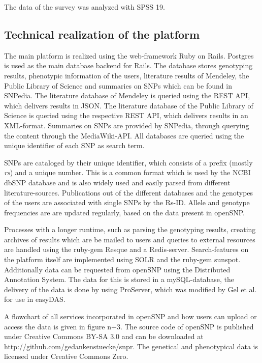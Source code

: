 \documentclass[10pt]{article}
\begin{document}
The data of the survey was analyzed with SPSS 19. 

\subsection*{Technical realization of the platform}
The main platform is realized using the web-framework Ruby on Rails. Postgres is used as the main database backend for Rails. The database stores genotyping results, phenotypic information of the users, literature results of Mendeley, the Public Library of Science and summaries on SNPs which can be found in SNPedia. The literature database of Mendeley is queried using the REST API, which delivers results in JSON. The literature database of the Public Library of Science is queried using the respective REST API, which delivers results in an XML-format. Summaries on SNPs are provided by SNPedia, through querying the content through the MediaWiki-API. All databases are queried using the unique identifier of each SNP as search term. 

SNPs are cataloged by their unique identifier, which consists of a prefix (mostly \textit{rs}) and a unique number. This is a common format which is used by the NCBI dbSNP database and is also widely used and easily parsed from different literature-sources. Publications out of the different databases and the genotypes of the users are associated with single SNPs by the Rs-ID. Allele and genotype frequencies are are updated regularly, based on the data present in openSNP. 

Processes with a longer runtime, such as parsing the genotyping results, creating archives of results which are be mailed to users and queries to external resources are handled using the ruby-gem Resque and a Redis-server. Search-features on the platform itself are implemented using SOLR and the ruby-gem sunspot. Additionally data can be requested from openSNP using the Distributed Annotation System. The data for this is stored in a mySQL-database, the delivery of the data is done by using ProServer, which was modified by Gel et al. for use in easyDAS.  

A flowchart of all services incorporated in openSNP and how users can upload or access the data is given in figure n+3. The source code of openSNP is published under Creative Commons BY-SA 3.0 and can be downloaded at http://github.com/gedankenstuecke/snpr. The genetical and phenotypical data is licensed under Creative Commons Zero. 
\end{document}
